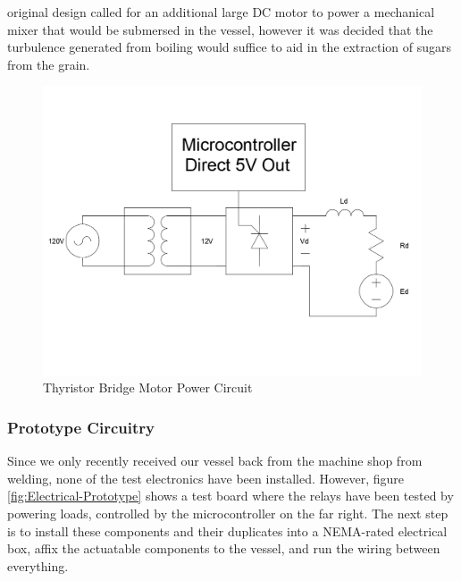 \documentclass{article}
\begin{document}
 original design called for an additional large DC motor to power a mechanical mixer that would be submersed in the vessel, however it was decided that the turbulence generated from boiling would suffice to aid in the extraction of sugars from the grain.

\begin{figure}[H]
\begin{center}
\includegraphics[scale=0.20]{motor-thyristor-dc-circuit.png}
\caption{Thyristor Bridge Motor Power Circuit}
\label{fig:motor-thyristor-dc-circuit}
\end{center}
\end{figure}

\subsubsection{Prototype Circuitry}
Since we only recently received our vessel back from the machine shop from welding, none of the test electronics have been installed. However, figure \ref{fig:Electrical-Prototype} shows a test board where the relays have been tested by powering loads, controlled by the microcontroller on the far right. The next step is to install these components and their duplicates into a NEMA-rated electrical box, affix the actuatable components to the vessel, and run the wiring between everything.
\end{document}
